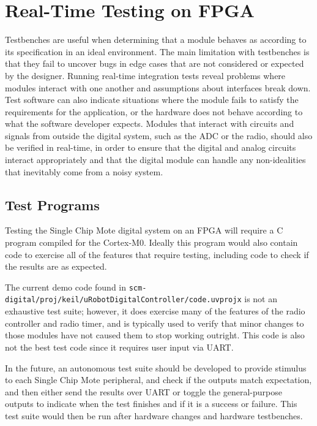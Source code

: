 \section{Real-Time Testing on FPGA}
Testbenches are useful when determining that a module behaves as according to its specification in an ideal environment. The main limitation with testbenches is that they fail to uncover bugs in edge cases that are not considered or expected by the designer. Running real-time integration tests reveal problems where modules interact with one another and assumptions about interfaces break down. Test software can also indicate situations where the module fails to satisfy the requirements for the application, or the hardware does not behave according to what the software developer expects. Modules that interact with circuits and signals from outside the digital system, such as the ADC or the radio, should also be verified in real-time, in order to ensure that the digital and analog circuits interact appropriately and that the digital module can handle any non-idealities that inevitably come from a noisy system.

\subsection{Test Programs}
Testing the Single Chip Mote digital system on an FPGA will require a C program compiled for the Cortex-M0. Ideally this program would also contain code to exercise all of the features that require testing, including code to check if the results are as expected.

The current demo code found in \texttt{scm-digital/proj/keil/uRobotDigitalCon\-t\-r\-oller/code.uvprojx} is not an exhaustive test suite; however, it does exercise many of the features of the radio controller and radio timer, and is typically used to verify that minor changes to those modules have not caused them to stop working outright. This code is also not the best test code since it requires user input via UART.

In the future, an autonomous test suite should be developed to provide stimulus to each Single Chip Mote peripheral, and check if the outputs match expectation, and then either send the results over UART or toggle the general-purpose outputs to indicate when the test finishes and if it is a success or failure. This test suite would then be run after hardware changes and hardware testbenches.

